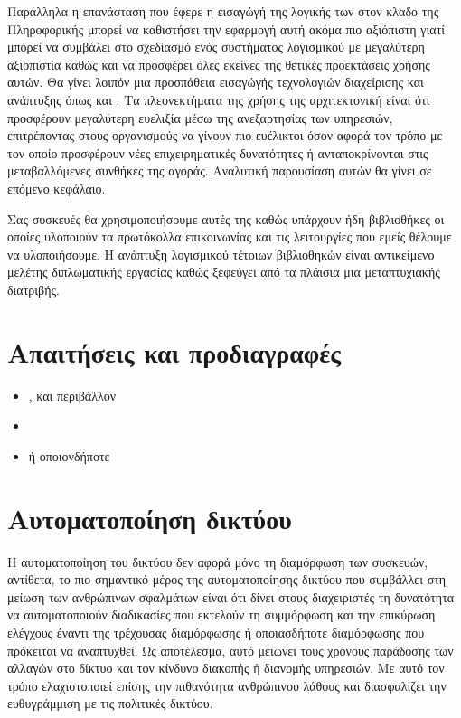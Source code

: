 Παράλληλα η επανάσταση που έφερε η εισαγώγή της λογικής των  στον κλαδο της Πληροφορικής μπορεί να καθιστήσει την εφαρμογή αυτή ακόμα πιο αξιόπιστη
γιατί μπορεί να συμβάλει στο σχεδίασμό ενός συστήματος λογισμικού με μεγαλύτερη αξιοπιστία καθώς και να προσφέρει όλες εκείνες της θετικές προεκτάσεις χρήσης αυτών.
Θα γίνει λοιπόν μια προσπάθεια εισαγώγής τεχνολογιών διαχείρισης και ανάπτυξης  όπως  και . Τα πλεονεκτήματα της χρήσης της αρχιτεκτονική  είναι ότι προσφέρουν μεγαλύτερη ευελιξία 
μέσω της ανεξαρτησίας των υπηρεσιών, επιτρέποντας στους οργανισμούς να γίνουν πιο ευέλικτοι όσον αφορά τον τρόπο με τον οποίο προσφέρουν νέες επιχειρηματικές δυνατότητες ή ανταποκρίνονται στις μεταβαλλόμενες συνθήκες της αγοράς. Αναλυτική παρουσίαση αυτών θα γίνει σε επόμενο κεφάλαιο. 

Σας συσκευές θα χρησιμοποιήσουμε αυτές της  καθώς υπάρχουν ήδη βιβλιοθήκες οι οποίες υλοποιούν τα πρωτόκολλα επικοινωνίας και τις λειτουργίες που 
εμείς θέλουμε να υλοποιήσουμε. Η ανάπτυξη λογισμικού τέτοιων βιβλιοθηκών είναι αντικείμενο μελέτης διπλωματικής εργασίας καθώς ξεφεύγει από τα πλάισια μια μεταπτυχιακής διατριβής.

\section{Απαιτήσεις και προδιαγραφές}
\begin{itemize}
    \item {} ,  και  περιβάλλον
    \item {}
    \item {} ή οποιονδήποτε 
\end{itemize}

\section{Αυτοματοποίηση δικτύου}
Η αυτοματοποίηση του δικτύου δεν αφορά μόνο τη διαμόρφωση των συσκευών, αντίθετα, το πιο σημαντικό μέρος της αυτοματοποίησης δικτύου που συμβάλλει στη μείωση των ανθρώπινων σφαλμάτων είναι ότι δίνει στους
διαχειριστές τη δυνατότητα να αυτοματοποιούν διαδικασίες που εκτελούν τη συμμόρφωση και την επικύρωση  ελέγχους έναντι της τρέχουσας διαμόρφωσης ή οποιασδήποτε διαμόρφωσης που πρόκειται να αναπτυχθεί. 
Ως αποτέλεσμα, αυτό μειώνει τους χρόνους παράδοσης των αλλαγών στο δίκτυο και τον κίνδυνο διακοπής ή διανομής υπηρεσιών. Με αυτό τον τρόπο ελαχιστοποιεί επίσης την πιθανότητα ανθρώπινου λάθους και διασφαλίζει την ευθυγράμμιση με τις πολιτικές δικτύου.

